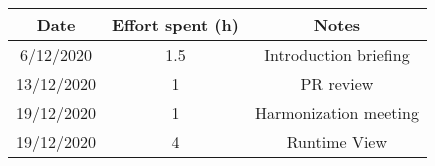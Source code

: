 \documentclass[../../main.tex]{subfiles}
\begin{document}
\begin{center}
    \begin{tabular}{|c| |c| |c|} 
        \hline
        Date & Effort spent (h) & Notes\\ [0.5ex] 
        \hline\hline
        6/12/2020 & 1.5 & Introduction briefing\\ 
        13/12/2020 & 1 & PR review\\
        19/12/2020 & 1 & Harmonization meeting\\
        19/12/2020 & 4 & Runtime View\\
        \hline
    \end{tabular}
\end{center}
\end{document}
